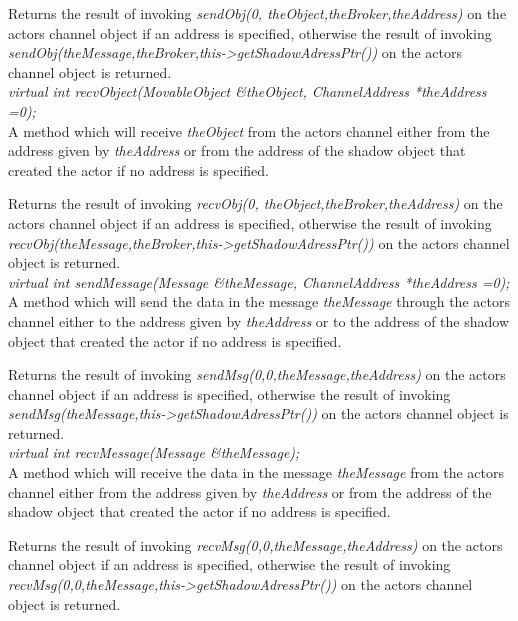 Returns the result of invoking {\em sendObj(0, theObject,theBroker,theAddress)} on
the actors channel object if an address is specified, otherwise
the result of invoking {\em
sendObj(theMessage,theBroker,this->getShadowAdressPtr())} on the
actors channel object is returned. \\ 

{\em virtual int recvObject(MovableObject \&theObject, ChannelAddress
*theAddress =0);}\\
A method which will receive {\em theObject}
from the actors channel either from the address given by {\em
theAddress} or from the address of the shadow object that created the
actor if no address is specified.

Returns the result of invoking {\em recvObj(0, theObject,theBroker,theAddress)} on
the actors channel object if an address is specified, otherwise
the result of invoking {\em
recvObj(theMessage,theBroker,this->getShadowAdressPtr())} on the actors channel
object is returned. \\ 



{\em virtual int sendMessage(Message \&theMessage, ChannelAddress
*theAddress =0);}\\
A method which will send the data in the message {\em theMessage} 
through the actors channel either to the address given by {\em
theAddress} or to the address of the shadow object that created the
actor if no address is specified.

Returns the result of invoking {\em sendMsg(0,0,theMessage,theAddress)} on
the actors channel object if an address is specified, otherwise
the result of invoking {\em
sendMsg(theMessage,this->getShadowAdressPtr())} on the actors channel
object is returned. \\ 


{\em virtual int recvMessage(Message \&theMessage);} \\
A method which will receive the data in the message {\em theMessage} from
the actors channel either from the address given by {\em
theAddress} or from the address of the shadow object that created the
actor if no address is specified.

Returns the result of invoking {\em recvMsg(0,0,theMessage,theAddress)} on
the actors channel object if an address is specified, otherwise
the result of invoking {\em
recvMsg(0,0,theMessage,this->getShadowAdressPtr())} on the actors channel
object is returned. \\ 

